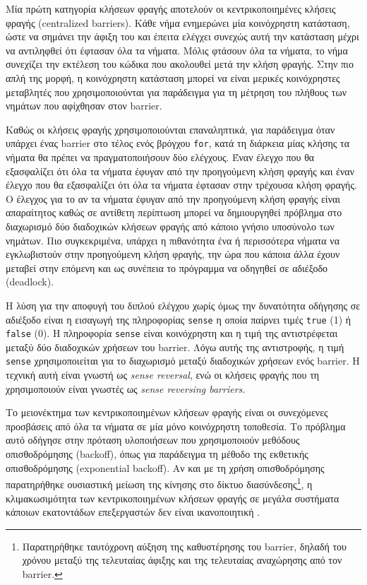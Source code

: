 Μία πρώτη κατηγορία κλήσεων φραγής αποτελούν οι κεντρικοποιημένες κλήσεις φραγής (centralized barriers). Κάθε νήμα ενημερώνει μία κοινόχρηστη κατάσταση, ώστε να σημάνει την άφιξη του και έπειτα ελέγχει συνεχώς αυτή την κατάσταση μέχρι να αντιληφθεί ότι έφτασαν όλα τα νήματα. Μόλις φτάσουν όλα τα νήματα, το νήμα συνεχίζει την εκτέλεση του κώδικα που ακολουθεί μετά την κλήση φραγής. Στην πιο απλή της μορφή, η κοινόχρηστη κατάσταση μπορεί να είναι μερικές κοινόχρηστες μεταβλητές που χρησιμοποιούνται για παράδειγμα για τη μέτρηση του πλήθους των νημάτων που αφίχθησαν στον barrier.

Καθώς οι κλήσεις φραγής χρησιμοποιούνται επαναληπτικά, για παράδειγμα όταν υπάρχει ένας barrier στο τέλος ενός βρόγχου \texttt{for}, κατά τη διάρκεια μίας κλήσης τα νήματα θα πρέπει να πραγματοποιήσουν δύο ελέγχους. Έναν έλεγχο που θα εξασφαλίζει ότι όλα τα νήματα έφυγαν από την προηγούμενη κλήση φραγής και έναν έλεγχο που θα εξασφαλίζει ότι όλα τα νήματα έφτασαν στην τρέχουσα κλήση φραγής. Ο έλεγχος για το αν τα νήματα έφυγαν από την προηγούμενη κλήση φραγής είναι απαραίτητος καθώς σε αντίθετη περίπτωση μπορεί να δημιουργηθεί πρόβλημα στο διαχωρισμό δύο διαδοχικών κλήσεων φραγής από κάποιο γνήσιο υποσύνολο των νημάτων. Πιο συγκεκριμένα, υπάρχει η πιθανότητα ένα ή περισσότερα νήματα να εγκλωβιστούν στην προηγούμενη κλήση φραγής, την ώρα που κάποια άλλα έχουν μεταβεί στην επόμενη και ως συνέπεια το πρόγραμμα να οδηγηθεί σε αδιέξοδο (deadlock).

Η λύση για την αποφυγή του διπλού ελέγχου χωρίς όμως την δυνατότητα οδήγησης σε αδιέξοδο είναι η εισαγωγή της πληροφορίας \texttt{sense} η οποία παίρνει τιμές \texttt{true} (1) ή \texttt{false} (0). Η πληροφορία \texttt{sense} είναι κοινόχρηστη και η τιμή της αντιστρέφεται μεταξύ δύο διαδοχικών χρήσεων του barrier. Λόγω αυτής της αντιστροφής, η τιμή \texttt{sense} χρησιμοποιείται για το διαχωρισμό μεταξύ διαδοχικών χρήσεων ενός barrier. Η τεχνική αυτή είναι γνωστή ως \textit{sense reversal}, ενώ οι κλήσεις φραγής που τη χρησιμοποιούν είναι γνωστές ως \textit{sense reversing barriers}.

Το μειονέκτημα των κεντρικοποιημένων κλήσεων φραγής είναι οι συνεχόμενες προσβάσεις από όλα τα νήματα σε μία μόνο κοινόχρηστη τοποθεσία. Το πρόβλημα αυτό οδήγησε στην πρόταση υλοποιήσεων που χρησιμοποιούν μεθόδους οπισθοδρόμησης (backoff), όπως για παράδειγμα τη μέθοδο της εκθετικής οπισθοδρόμησης (exponential backoff).  Αν και με τη χρήση οπισθοδρόμησης παρατηρήθηκε ουσιαστική μείωση της κίνησης στο δίκτυο διασύνδεσης\footnote{Παρατηρήθηκε ταυτόχρονη αύξηση της καθυστέρησης του barrier, δηλαδή του χρόνου μεταξύ της τελευταίας άφιξης και της τελευταίας αναχώρησης από τον barrier.}, η κλιμακωσιμότητα των κεντρικοποιημένων κλήσεων φραγής σε μεγάλα συστήματα κάποιων εκατοντάδων επεξεργαστών δεν είναι ικανοποιητική \cite{mellor1991algorithms}.

